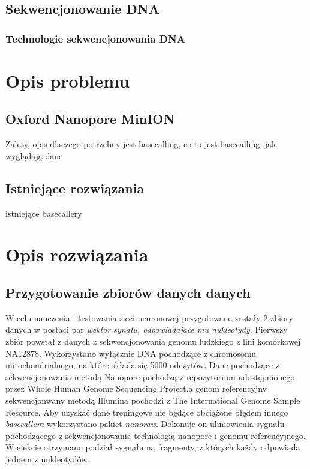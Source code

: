 \documentclass[a4paper,11pt,twoside]{report}
\theoremstyle{definition}
\begin{document}
\section*{Sekwencjonowanie DNA}

\subsection*{Technologie sekwencjonowania DNA}

\chapter*{Opis problemu}

\section*{Oxford Nanopore MinION}
Zalety, opis dlaczego potrzebny jest basecalling, co to jest basecalling, jak wyglądają dane

\section*{Istniejące rozwiązania}
istniejące basecallery

\chapter*{Opis rozwiązania}

\section*{Przygotowanie zbiorów danych danych}

W celu nauczenia i testowania sieci neuronowej przygotowane zostały 2 zbiory danych w postaci par \textit{wektor synału, odpowiadające mu nukleotydy}.
Pierwszy zbiór powstał z danych z sekwencjonowania genomu ludzkiego z lini komórkowej NA12878. Wykorzystano wyłącznie DNA pochodzące z chromosomu mitochondrialnego, na które składa się 5000 odczytów.
Dane pochodzące z sekwencjonowania metodą Nanopore pochodzą z repozytorium udostępnionego przez Whole Human Genome Sequencing Project\cite{nanoporeHuman},a genom referencyjny sekwencjonwany metodą Illumina pochodzi z The International Genome Sample Resource\cite{refGenome}. Aby uzyskać dane treningowe nie będące obciążone błędem innego \textit{basecallera} wykorzystano pakiet \textit{nanoraw}\cite{nanoraw}. Dokonuje on uliniowienia sygnału pochodzącego z sekwencjonowania technologią nanopore i genomu referencyjnego. W efekcie otrzymano podział sygnału na fragmenty, z których każdy odpowiada jednem z nukleotydów.
\end{document}
